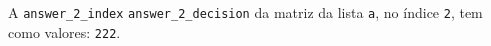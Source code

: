 \documentclass[12pt,varwidth=16cm,border=1pt]{standalone}
\begin{document}
A \verb+answer_2_index+ \verb+answer_2_decision+ da matriz da lista \verb+a+, no índice \verb+2+, tem como valores: \verb+222+.

\questiomfalse
\end{document}
